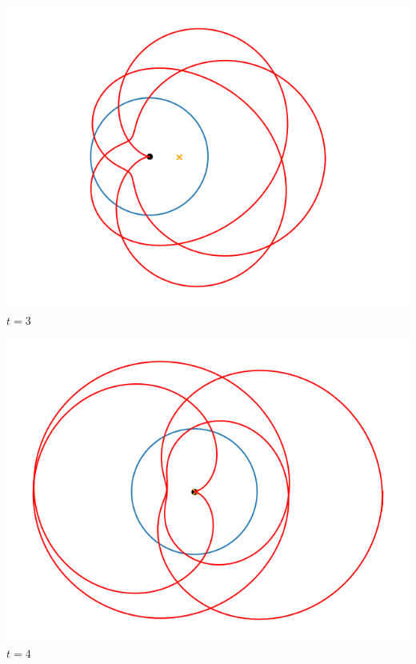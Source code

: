 \documentclass[11pt,class=report,crop=false]{standalone}
\begin{document}
\begin{center}
\begin{minipage}{0.24\textwidth}
	\center \includegraphics[scale=\myscale,scale=0.3]{figures/fourier-9-3}
	$t = 3$ 
	\end{minipage}
	\begin{minipage}{0.24\textwidth}
	\center \includegraphics[scale=\myscale,scale=0.3]{figures/fourier-9-4}
	$t = 4$ 
	\end{minipage}



\end{center}
\end{document}
